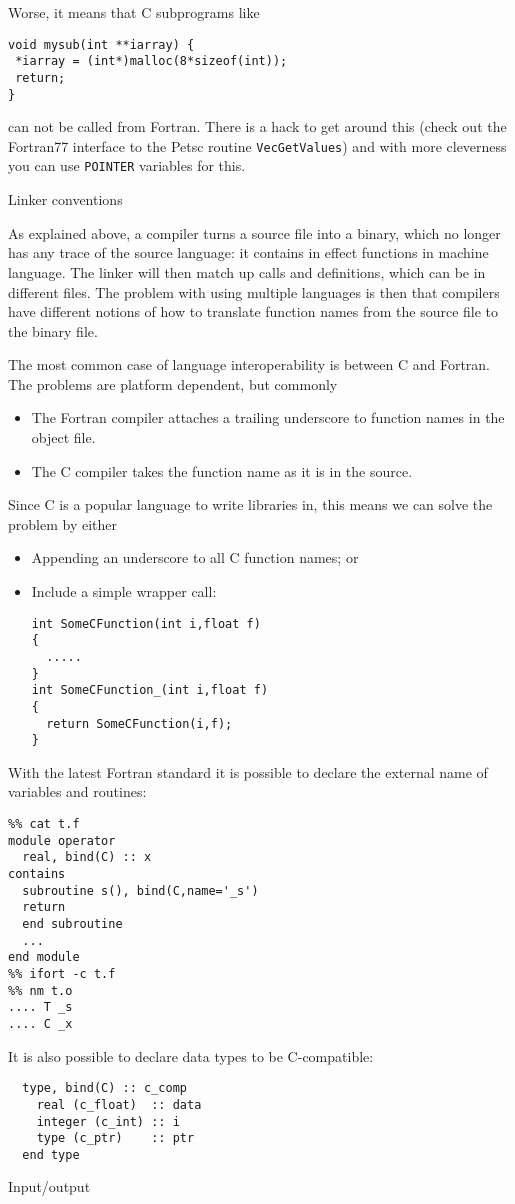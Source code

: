Worse, it means that C subprograms like
\begin{verbatim}
void mysub(int **iarray) {
 *iarray = (int*)malloc(8*sizeof(int));
 return;
}
\end{verbatim}
can not be called from Fortran. There is a hack to get around this
(check out the Fortran77 interface to the Petsc routine
\texttt{VecGetValues}) and with more cleverness you can use
\texttt{POINTER} variables for this.

 {Linker conventions}

As explained above, a compiler turns a source file into a binary,
which no longer has any trace of the source language: it contains in
effect functions in machine language. The linker will then match up
calls and definitions, which can be in different files. The problem
with using multiple languages is then that compilers have different
notions of how to translate function names from the source file to the
binary file.

The most common case of language interoperability is between C and
Fortran. The problems are platform dependent, but commonly
\begin{itemize}
\item The Fortran compiler attaches a trailing underscore to function
  names in the object file.
\item The C compiler takes the function name as it is in the source.
\end{itemize}
Since C is a popular language to write libraries in, this means we can
solve the problem by either
\begin{itemize}
\item Appending an underscore to all C function names; or
\item Include a simple wrapper call:
\begin{verbatim}
int SomeCFunction(int i,float f)
{
  .....
}
int SomeCFunction_(int i,float f)
{
  return SomeCFunction(i,f);
}
\end{verbatim}
\end{itemize}

With the latest Fortran standard it is possible to declare the
external name of variables and routines:
\begin{verbatim}
%% cat t.f
module operator
  real, bind(C) :: x
contains
  subroutine s(), bind(C,name='_s')
  return
  end subroutine
  ...
end module
%% ifort -c t.f
%% nm t.o
.... T _s
.... C _x
\end{verbatim}

It is also possible to declare data types to be C-compatible:
\begin{verbatim}
  type, bind(C) :: c_comp
    real (c_float)  :: data
    integer (c_int) :: i
    type (c_ptr)    :: ptr
  end type
\end{verbatim}
 {Input/output}

